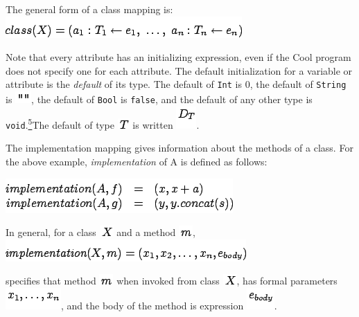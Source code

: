 \documentclass[]{article}
\begin{document}
The general form of a class mapping is: \\

\includegraphics{img147.png}

Note that every attribute has an initializing expression, even if the
Cool program does not specify one for each attribute. The default
initialization for a variable or attribute is the \emph{default} of its
type. The default of \texttt{Int} is 0, the default of \texttt{String}
is \includegraphics{img148.png}, the default of \texttt{Bool} is
\texttt{false}, and the default of any other type is
\texttt{void}.\href{footnode.html\#foot1803}{\textsuperscript{5}}The
default of type \includegraphics{img58.png} is written
\includegraphics{img149.png}.

The implementation mapping gives information about the methods of a
class. For the above example, \emph{implementation} of A is defined as
follows:

\includegraphics{img150.png}

In general, for a class \includegraphics{img141.png} and a method
\includegraphics{img151.png}, \\

\includegraphics{img152.png}

specifies that method \includegraphics{img151.png} when invoked from
class \includegraphics{img141.png}, has formal parameters
\includegraphics{img153.png}, and the body of the method is expression
\includegraphics{img154.png}.
\end{document}
